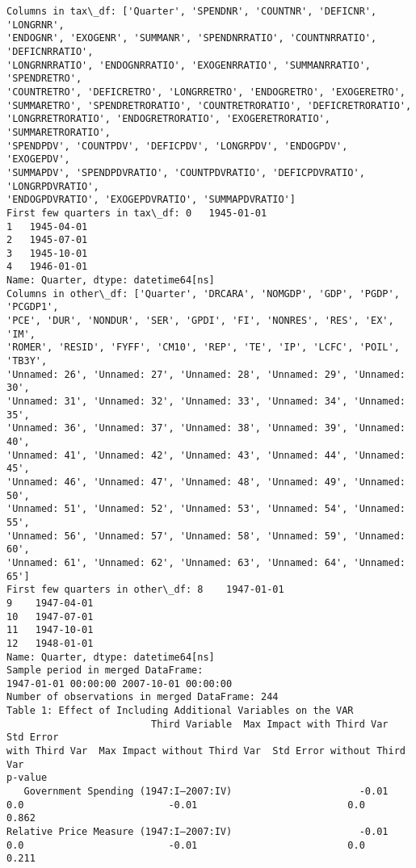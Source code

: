 \documentclass[11pt]{article}
\begin{document}
    \begin{Verbatim}[commandchars=\\\{\}]
Columns in tax\_df: ['Quarter', 'SPENDNR', 'COUNTNR', 'DEFICNR', 'LONGRNR',
'ENDOGNR', 'EXOGENR', 'SUMMANR', 'SPENDNRRATIO', 'COUNTNRRATIO', 'DEFICNRRATIO',
'LONGRNRRATIO', 'ENDOGNRRATIO', 'EXOGENRRATIO', 'SUMMANRRATIO', 'SPENDRETRO',
'COUNTRETRO', 'DEFICRETRO', 'LONGRRETRO', 'ENDOGRETRO', 'EXOGERETRO',
'SUMMARETRO', 'SPENDRETRORATIO', 'COUNTRETRORATIO', 'DEFICRETRORATIO',
'LONGRRETRORATIO', 'ENDOGRETRORATIO', 'EXOGERETRORATIO', 'SUMMARETRORATIO',
'SPENDPDV', 'COUNTPDV', 'DEFICPDV', 'LONGRPDV', 'ENDOGPDV', 'EXOGEPDV',
'SUMMAPDV', 'SPENDPDVRATIO', 'COUNTPDVRATIO', 'DEFICPDVRATIO', 'LONGRPDVRATIO',
'ENDOGPDVRATIO', 'EXOGEPDVRATIO', 'SUMMAPDVRATIO']
First few quarters in tax\_df: 0   1945-01-01
1   1945-04-01
2   1945-07-01
3   1945-10-01
4   1946-01-01
Name: Quarter, dtype: datetime64[ns]
Columns in other\_df: ['Quarter', 'DRCARA', 'NOMGDP', 'GDP', 'PGDP', 'PCGDP1',
'PCE', 'DUR', 'NONDUR', 'SER', 'GPDI', 'FI', 'NONRES', 'RES', 'EX', 'IM',
'ROMER', 'RESID', 'FYFF', 'CM10', 'REP', 'TE', 'IP', 'LCFC', 'POIL', 'TB3Y',
'Unnamed: 26', 'Unnamed: 27', 'Unnamed: 28', 'Unnamed: 29', 'Unnamed: 30',
'Unnamed: 31', 'Unnamed: 32', 'Unnamed: 33', 'Unnamed: 34', 'Unnamed: 35',
'Unnamed: 36', 'Unnamed: 37', 'Unnamed: 38', 'Unnamed: 39', 'Unnamed: 40',
'Unnamed: 41', 'Unnamed: 42', 'Unnamed: 43', 'Unnamed: 44', 'Unnamed: 45',
'Unnamed: 46', 'Unnamed: 47', 'Unnamed: 48', 'Unnamed: 49', 'Unnamed: 50',
'Unnamed: 51', 'Unnamed: 52', 'Unnamed: 53', 'Unnamed: 54', 'Unnamed: 55',
'Unnamed: 56', 'Unnamed: 57', 'Unnamed: 58', 'Unnamed: 59', 'Unnamed: 60',
'Unnamed: 61', 'Unnamed: 62', 'Unnamed: 63', 'Unnamed: 64', 'Unnamed: 65']
First few quarters in other\_df: 8    1947-01-01
9    1947-04-01
10   1947-07-01
11   1947-10-01
12   1948-01-01
Name: Quarter, dtype: datetime64[ns]
Sample period in merged DataFrame:
1947-01-01 00:00:00 2007-10-01 00:00:00
Number of observations in merged DataFrame: 244
Table 1: Effect of Including Additional Variables on the VAR
                         Third Variable  Max Impact with Third Var  Std Error
with Third Var  Max Impact without Third Var  Std Error without Third Var
p-value
   Government Spending (1947:I–2007:IV)                      -0.01
0.0                         -0.01                          0.0    0.862
Relative Price Measure (1947:I–2007:IV)                      -0.01
0.0                         -0.01                          0.0    0.211
    \end{Verbatim}
\end{document}
